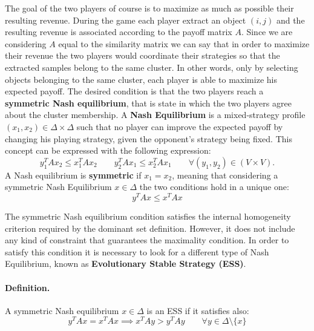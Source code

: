 The goal of the two players of course is to maximize as much as possible their resulting revenue. During the game each player extract an object $(i,j)$ and the resulting revenue is associated according to the payoff matrix $A$. Since we are considering $A$ equal to the similarity matrix we can say that in order to maximize their revenue the two players would coordinate their strategies so that the extracted samples belong to the same cluster. In other words, only by selecting objects belonging to the same cluster, each player is able to maximize his expected payoff. The desired condition is that the two players reach a \textbf{symmetric Nash equilibrium}, that is state in which the two players agree about the cluster membership. A \textbf{Nash Equilibrium} is a mixed-strategy profile $(x_1,x_2)\in \Delta\times \Delta$ such that no player can improve the expected payoff by changing his playing strategy, given the opponent's strategy being fixed. This concept can be expressed with the following expression:\\
$$y_1^TAx_2 \leq x_1^TAx_2 \qquad y_2^TAx_1 \leq x_2^TAx_1 \qquad \forall (y_1,y_2) \in (V\times V).$$ 
A Nash equilibrium is \textbf{symmetric} if $x_1 = x_2$, meaning that considering a symmetric Nash Equilibrium $x \in \Delta$ the two conditions hold in a unique one:\\
$$y^TAx \leq x^TAx$$

The symmetric Nash equilibrium condition satisfies the internal homogeneity criterion required by the dominant set definition. However, it does not include any kind of constraint that guarantees the maximality condition. In order to satisfy this condition it is necessary to look for a different type of Nash Equilibrium, known as \textbf{Evolutionary Stable Strategy (ESS)}. 

\paragraph{Definition.} A symmetric Nash equilibrium $x\in \Delta$ is an ESS if it satisfies also:
$$y^TAx = x^TAx \implies x^TAy > y^TAy \qquad \forall y \in \Delta\setminus\{x\}$$

